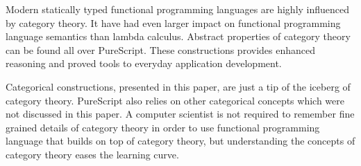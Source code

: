 \documentclass[article]{aaltoseries}
\begin{document}
Modern statically typed functional programming languages are highly influenced
by category theory. It have had even larger impact on functional programming
language semantics than lambda calculus. Abstract properties of category theory
can be found all over PureScript. These constructions provides enhanced
reasoning and proved tools to everyday application development.
 
Categorical constructions, presented in this paper, are just a tip of the
iceberg of category theory. PureScript also relies on other categorical concepts
which were not discussed in this paper. A computer scientist is not required to
remember fine grained details of category theory in order to use functional
programming language that builds on top of category theory, but understanding
the concepts of category theory eases the learning curve.




\end{document}
